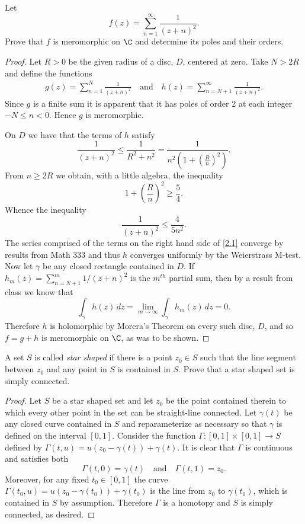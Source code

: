 \documentclass[10pt]{amsart}
\begin{document}
\begin{thm}
  \label{Ex2}
  Let $$f(z) = \sum\limits_{n=1}^\infty \dfrac{1}{(z+n)^2}.$$
Prove that $f$ is meromorphic on $\C$ and determine its poles and their orders.
\begin{proof}
  Let $R>0$ be the given radius of a disc, $D$, centered at zero.
  Take $N > 2R$ and define the functions
  \begin{align*}
    g(z) = \sum_{n=1}^N \frac{1}{(z+n)^2} \quad \text{and} \quad h(z) = \sum_{n=N+1}^{\infty} \frac{1}{(z+n)^2}.
  \end{align*}
  Since $g$ is a finite sum it is apparent that it has poles of order 2 at each integer $-N \leq n < 0$.
  Hence $g$ is meromorphic.
  
  On $D$ we have that the terms of $h$ satisfy
  $$\frac{1}{(z+n)^2} \leq \frac{1}{R^2 + n^2} = \frac{1}{n^2\left(1 + \left(\frac{R}{n}\right)^2\right)}.$$
  From $n \geq 2R$ we obtain, with a little algebra, the inequality $$1 + \left(\frac{R}{n}\right)^2 \geq \frac{5}{4}.$$
  Whence the inequality 
  \begin{equation}
    \label{2.1}
    \frac{1}{(z+n)^2} \leq \frac{4}{5n^2}.
  \end{equation}
  The series comprised of the terms on the right hand side of \eqref{2.1} converge by results from Math 333 and thus $h$ converges uniformly by the Weierstrass M-test.
  Now let $\gamma$ be any closed rectangle contained in $D$.
  If $h_m(z) = \sum_{n=N+1}^m 1/(z+n)^2$ is the $m^{th}$ partial sum, then by a result from class we know that 
  $$\int_\gamma h(z)\,dz = \lim_{m\rightarrow\infty} \int_{\gamma} h_m(z)\,dz = 0.$$
  Therefore $h$ is holomorphic by Morera's Theorem on every such disc, $D$, and so $f = g + h$ is meromorphic on $\C$, as was to be shown.
\end{proof}
\end{thm}

\begin{thm}
  \label{Ex3}
  A set $S$ is called {\it star shaped} if there is a point $z_0 \in S$ such that
the line segment between $z_0$ and any point in $S$ is contained in $S$.
Prove that a star shaped set is simply connected.
\begin{proof}
  Let $S$ be a star shaped set and let $z_0$ be the point contained therein to which every other point in the set can be straight-line connected.
  Let $\gamma(t)$ be any closed curve contained in $S$ and reparameterize as necessary so that $\gamma$ is defined on the interval $[0,1]$.
  Consider the function $\Gamma:[0,1]\times[0,1] \longrightarrow S$ defined by $\Gamma(t,u) = u(z_0 - \gamma(t)) + \gamma(t)$.
  It is clear that $\Gamma$ is continuous and satisfies both 
  $$\Gamma(t,0) = \gamma(t) \quad \text{and} \quad \Gamma(t,1) = z_0.$$
  Moreover, for any fixed $t_0 \in [0,1]$ the curve $\Gamma(t_0,u) = u(z_0 - \gamma(t_0)) + \gamma(t_0)$ is the line from $z_0$ to $\gamma(t_0)$, which is contained in $S$ by assumption.
  Therefore $\Gamma$ is a homotopy and $S$ is simply connected, as desired.
\end{proof} 
\end{thm}
\end{document}
